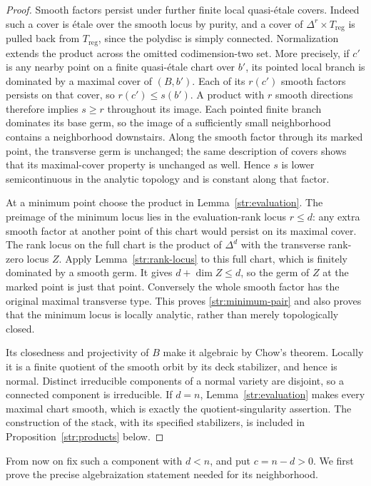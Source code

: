 \begin{proof}
Smooth factors persist under further finite local quasi-\'etale covers.
Indeed such a cover is \'etale over the smooth locus by purity, and a
cover of $\Delta^r\times T_{\mathrm{reg}}$ is pulled back from
$T_{\mathrm{reg}}$, since the polydisc is simply connected.  Normalization
extends the product across the omitted codimension-two set.  More
precisely, if $c'$ is any nearby point on a finite quasi-\'etale chart
over $b'$, its pointed local branch is dominated by a maximal cover of
$(B,b')$.  Each of its $r(c')$ smooth factors persists on that cover,
so $r(c')\leq s(b')$.  A product with $r$ smooth directions therefore
implies $s\geq r$ throughout its image.  Each pointed finite branch
dominates its base germ, so the image of a sufficiently small
neighborhood contains a neighborhood downstairs.  Along the smooth factor
through its marked point, the transverse germ is unchanged; the same
description of covers shows that its maximal-cover property is unchanged
as well.  Hence $s$ is lower semicontinuous in the analytic topology
and is constant along that factor.

At a minimum point choose the product in Lemma~\ref{str:evaluation}.
The preimage of the minimum locus lies in the evaluation-rank locus
$r\leq d$: any extra smooth factor at another point of this chart
would persist on its maximal cover.  The rank locus on the full chart
is the product of $\Delta^d$ with the transverse rank-zero locus $Z$.
Apply Lemma~\ref{str:rank-locus} to this full chart, which is finitely
dominated by a smooth germ.  It gives $d+\dim Z\leq d$, so the germ of
$Z$ at the marked point is just that point.  Conversely the whole smooth factor
has the original maximal transverse type.  This proves
\eqref{str:minimum-pair} and also proves that the minimum locus is locally
analytic, rather than merely topologically closed.

Its closedness and projectivity of $B$ make it algebraic by Chow's
theorem.  Locally it is a finite quotient of the smooth orbit by its
deck stabilizer, and hence is normal.  Distinct irreducible components
of a normal variety are disjoint, so a connected component is
irreducible.  If $d=n$, Lemma~\ref{str:evaluation} makes every maximal
chart smooth, which is exactly the quotient-singularity assertion.
The construction of the stack, with its specified stabilizers, is
included in Proposition~\ref{str:products} below.
\end{proof}

From now on fix such a component with $d<n$, and put $c=n-d>0$.
We first prove the precise algebraization statement needed for its
neighborhood.

